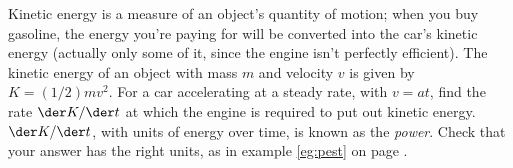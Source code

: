 Kinetic energy is a measure of an object's quantity of motion; when you buy gasoline,  the
energy you're paying for will be converted into the car's kinetic energy (actually only some of
it, since the engine isn't perfectly efficient). The kinetic energy of an object with mass
$m$ and velocity $v$ is given by $K=(1/2)mv^2$. For a car accelerating at a steady rate, with
$v=at$, find the rate $\der K/\der t$ at which the engine is required to put out kinetic energy.
$\der K/\der t$, with units of energy over time, is known as the \emph{power}.
Check that your answer has the right units, as in example \ref{eg:pest} on page \pageref{eg:pest}.\answercheck
